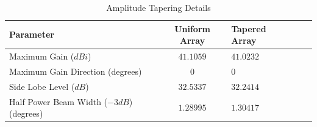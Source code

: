 \documentclass[11pt]{witseiepaper}
\begin{document}
\begin{table}[htb]
    \caption{Amplitude Tapering Details}
    \label{tab:AmplitudeTapering}
    \begin{center}
        \begin{tabular}{p{60mm}cp{40mm}cp{40mm}}
            \hline 
            Parameter & Uniform Array & Tapered Array \\
            \hline
            Maximum Gain ($dBi$) & $41.1059$ & $41.0232$ \\
            Maximum Gain Direction (degrees) & $0$ & $0$ \\
            Side Lobe Level ($dB$) & $32.5337$ & $32.2414$ \\
            Half Power Beam Width ($-3 dB$) (degrees) & $1.28995$ & $1.30417$ \\
            \hline
        \end{tabular}
    \end{center}
\end{table}









\end{document}
